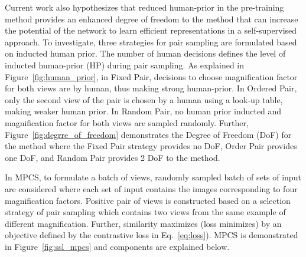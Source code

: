 \documentclass[conference]{IEEEtran}
\begin{document}
Current work also hypothesizes that reduced human-prior in the pre-training method provides an enhanced degree of freedom to the method that can increase the potential of the network to learn efficient representations in a self-supervised approach. To investigate, three strategies for pair sampling are formulated based on inducted human prior. The number of human decisions defines the level of inducted human-prior (HP) during pair sampling. As explained in Figure~\ref{fig:human_prior}, in Fixed Pair, decisions to choose magnification factor for both views are by human, thus making strong human-prior. In Ordered Pair, only the second view of the pair is chosen by a human using a look-up table, making weaker human prior. In Random Pair, no human prior inducted and magnification factor for both views are sampled randomly. Further, Figure~\ref{fig:degrre_of_freedom} demonstrates the Degree of Freedom (DoF) for the method where the Fixed Pair strategy provides no DoF, Order Pair provides one DoF, and Random Pair provides 2 DoF to the method. 






In MPCS, to formulate a batch of  views, randomly sampled batch of  sets of input  are considered where each set of input  contains the images corresponding to four magnification factors.
Positive pair of views is constructed based on a selection strategy of pair sampling which contains two views from the same example of different magnification. Further, similarity maximizes (loss minimizes) by an objective defined by the contrastive loss in Eq.~\ref{eq:loss}). MPCS is demonstrated in Figure~\ref{fig:ssl_mpcs} and components are explained below.
\end{document}
